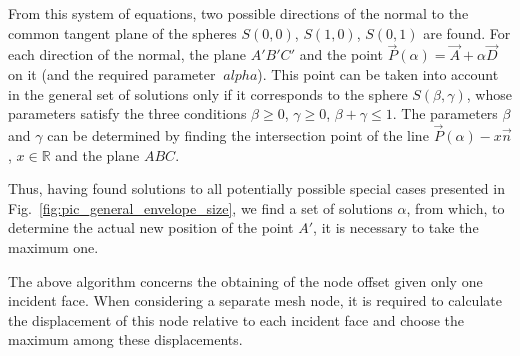 \documentclass[
11pt,%
tightenlines,%
twoside,%
onecolumn,%
nofloats,%
nobibnotes,%
nofootinbib,%
superscriptaddress,%
noshowpacs,%
centertags]%
{revtex4}
\begin{document}
From this system of equations, two possible directions of the normal to the common tangent plane of the spheres $S(0,0)$, $S(1,0)$, $S(0, 1)$ are found.
For each direction of the normal, the plane $A'B'C'$ and the point $\vec{P}(\alpha) = \vec{A} + \alpha \vec{D}$ on it (and the required parameter $\ alpha$).
This point can be taken into account in the general set of solutions only if it corresponds to the sphere $S(\beta, \gamma)$, whose parameters satisfy the three conditions $\beta \ge 0$, $\gamma \ge 0$, $ \beta + \gamma \le 1$.
The parameters $\beta$ and $\gamma$ can be determined by finding the intersection point of the line $\vec{P}(\alpha) - x \vec{n}$, $x \in \mathbb{R}$ and the plane $ABC$.

Thus, having found solutions to all potentially possible special cases presented in Fig.~\ref{fig:pic_general_envelope_size}, we find a set of solutions $\alpha$, from which, to determine the actual new position of the point $A'$, it is necessary to take the maximum one.

The above algorithm concerns the obtaining of the node offset given only one incident face.
When considering a separate mesh node, it is required to calculate the displacement of this node relative to each incident face and choose the maximum among these displacements.
\end{document}
